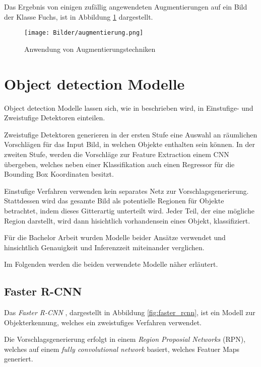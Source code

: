 Das Ergebnis von einigen zufällig angewendeten Augmentierungen 
auf ein Bild der Klasse Fuchs, ist
in Abbildung \ref{fig:augmentierung} dargestellt.

\begin{figure}[H]
    \centering
    \texttt{[image: Bilder/augmentierung.png]}
    \caption{Anwendung von Augmentierungstechniken}
    \label{fig:augmentierung}
\end{figure}


\section{Object detection Modelle}

Object detection Modelle lassen sich, wie in 
\cite{wuRecentAdvancesDeep2019} beschrieben wird,
in Einstufige- und Zweistufige Detektoren einteilen.

Zweistufige Detektoren generieren in der 
ersten Stufe eine Auswahl an räumlichen Vorschlägen
für das Input Bild, in welchen Objekte enthalten sein 
können. 
In der zweiten Stufe, werden die Vorschläge zur Feature 
Extraction einem CNN übergeben, welches neben 
einer Klassifikation auch einen Regressor für 
die Bounding Box Koordinaten besitzt.

Einstufige Verfahren verwenden kein separates 
Netz zur Vorschlagsgenerierung. Stattdessen 
wird das gesamte Bild als potentielle
Regionen für Objekte betrachtet, indem 
dieses Gitterartig unterteilt wird.
Jeder Teil, der eine mögliche Region darstellt, 
wird dann hisichtlich vorhandensein 
eines Objekt, klassifiziert.

Für die Bachelor Arbeit wurden 
Modelle beider Ansätze verwendet und 
hinsichtlich Genauigkeit und 
Inferenzzeit miteinander verglichen.

Im Folgenden werden die beiden 
verwendete Modelle näher erläutert.



\subsection*{Faster R-CNN}

Das \textit{Faster R-CNN} \cite{renFasterRCNNRealTime2016a}, 
dargestellt in Abbildung \ref{fig:faster_rcnn}, 
ist ein Modell zur Objekterkennung, welches
ein zweistufiges Verfahren verwendet.

Die Vorschlagsgenerierung erfolgt in einem 
\textit{Region Proposial Networks} (RPN), welches auf 
einem \textit{fully convolutional network} 
basiert, welches Featuer Maps generiert.

